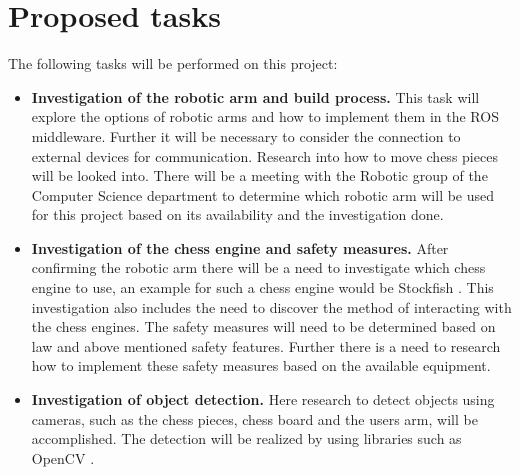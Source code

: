 \documentclass[11pt,fleqn,twoside]{article}
\begin{document}
\section{Proposed tasks}
The following tasks will be performed on this project:
\begin{itemize}
    \item \textbf{Investigation of the robotic arm and build process.} This task will explore the options
                  of robotic arms and how to implement them in the ROS middleware. Further it will be necessary 
                  to consider the connection to external devices for communication. Research into how to move 
                  chess pieces will be looked into.\newline
                  There will be a meeting with the Robotic group of the Computer Science department to 
                  determine which robotic arm will be used for this project based on its availability and the 
                  investigation done.\newline

    \item \textbf{Investigation of the chess engine and safety measures.} After confirming the robotic arm there 
                  will be a need to investigate which chess engine to use, an example for such a chess engine would 
                  be Stockfish \cite{stockfish}. This investigation also includes the need to discover the method of interacting with 
                  the chess engines.\newline
                  The safety measures will need to be determined based on law and above mentioned safety features. 
                  Further there is a need to research how to implement these safety measures based on the available 
                  equipment.

    \item \textbf{Investigation of object detection.} Here research to detect objects using cameras, such as 
                  the chess pieces, chess board and the users arm, will be accomplished. The detection will be 
                  realized by using libraries such as OpenCV \cite{openCV}.
                  

\end{itemize}
\end{document}
